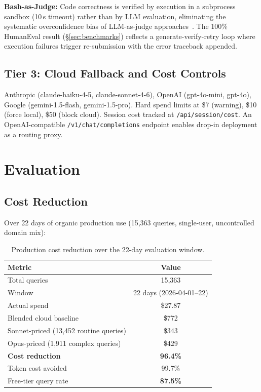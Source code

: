 \documentclass[11pt]{article}
\begin{document}
\textbf{Bash-as-Judge:} Code correctness is verified by execution in a
subprocess sandbox (10\,s timeout) rather than by LLM evaluation,
eliminating the systematic overconfidence bias of LLM-as-judge
approaches~\cite{zheng2023mtbench}. The 100\% HumanEval result
(\S\ref{sec:benchmarks}) reflects a generate-verify-retry loop where
execution failures trigger re-submission with the error traceback
appended.

\subsection{Tier 3: Cloud Fallback and Cost Controls}

Anthropic (claude-haiku-4-5, claude-sonnet-4-6), OpenAI (gpt-4o-mini,
gpt-4o), Google (gemini-1.5-flash, gemini-1.5-pro). Hard spend limits
at \$7 (warning), \$10 (force local), \$50 (block cloud). Session cost
tracked at \texttt{/api/session/cost}. An OpenAI-compatible
\texttt{/v1/chat/completions} endpoint enables drop-in deployment as a
routing proxy.

\section{Evaluation}

\subsection{Cost Reduction}

Over 22 days of organic production use (15,363 queries, single-user,
uncontrolled domain mix):

\begin{table}[t]
\centering
\small
\begin{tabular}{lc}
\toprule
\textbf{Metric} & \textbf{Value} \\
\midrule
Total queries & 15,363 \\
Window & 22 days (2026-04-01--22) \\
Actual spend & \$27.87 \\
Blended cloud baseline & \$772 \\
\quad Sonnet-priced (13,452 routine queries) & \$343 \\
\quad Opus-priced (1,911 complex queries) & \$429 \\
\textbf{Cost reduction} & \textbf{96.4\%} \\
Token cost avoided & 99.7\% \\
Free-tier query rate & \textbf{87.5\%} \\
\bottomrule
\end{tabular}
\caption{Production cost reduction over the 22-day evaluation window.}
\label{tab:cost}
\end{table}
\end{document}
